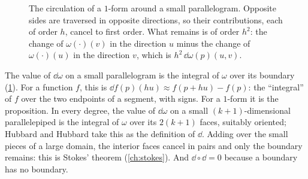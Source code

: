 \begin{notechapter}
\begin{figure}[ht]
\centering
{}
\caption{The circulation of a $1$-form around a small parallelogram.
Opposite sides are traversed in opposite directions, so their
contributions, each of order $h$, cancel to first order. What remains is
of order $h^2$: the change of $\omega(\cdot)(v)$ in the direction $u$
minus the change of $\omega(\cdot)(u)$ in the direction $v$, which is
$h^2\,\dd\omega(p)(u, v)$.}
\label{differential-forms:fig:circulation}
\end{figure}

\begin{intuition}
The value of $\dd\omega$ on a small parallelogram is the integral of
$\omega$ over its boundary
(\cref{differential-forms:fig:circulation}). For a function $f$, this is
$\dd f(p)(hu)\approx f(p + hu) - f(p)$: the ``integral'' of $f$ over the
two endpoints of a segment, with signs. For a $1$-form it is the
proposition. In every degree, the value of $\dd\omega$ on a small
$(k + 1)$-dimensional parallelepiped is the integral of $\omega$ over
its $2(k + 1)$ faces, suitably oriented; Hubbard and Hubbard take this
as the definition of $\dd$. Adding over the small pieces of a large
domain, the interior faces cancel in pairs and only the boundary
remains: this is Stokes' theorem (\cref{ch:stokes}). And
$\dd\circ\dd = 0$ because a boundary has no boundary.
\end{intuition}


\end{notechapter}
